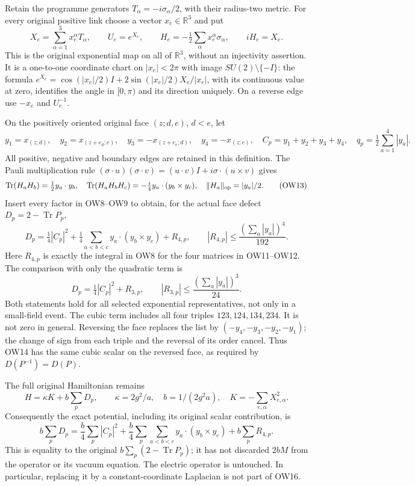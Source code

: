 \documentclass[11pt]{article}
\begin{document}
Retain the programme generators \(T_\alpha=-i\sigma_\alpha/2\), with their radius-two metric. For every original positive link choose a vector \(x_e\in\mathbb R^3\) and put
\[
 X_e=\sum_{\alpha=1}^3x_e^\alpha T_\alpha,
 \qquad U_e=e^{X_e},\qquad H_e=-\tfrac12\sum_\alpha x_e^\alpha\sigma_\alpha,
 \qquad iH_e=X_e.                                        \tag{OW11}
\]
This is the original exponential map on all of \(\mathbb R^3\), without an injectivity assertion. It is a one-to-one coordinate chart on \(|x_e|<2\pi\) with image \(SU(2)\setminus\{-I\}\): the formula \(e^{X_e}=\cos(|x_e|/2)I+2\sin(|x_e|/2)X_e/|x_e|\), with its continuous value at zero, identifies the angle in \([0,\pi)\) and its direction uniquely. On a reverse edge use \(-x_e\) and \(U_e^{-1}\).

On the positively oriented original face \((z;d,e)\), \(d<e\), let
\[
 y_1=x_{(z;d)},\quad y_2=x_{(z+e_d;e)},\quad
 y_3=-x_{(z+e_e;d)},\quad y_4=-x_{(z;e)},\quad
 C_p=y_1+y_2+y_3+y_4,\quad q_p=\tfrac12\sum_{a=1}^4|y_a|.
                                                               \tag{OW12}
\]
All positive, negative and boundary edges are retained in this definition. The Pauli multiplication rule \((\sigma\cdot u)(\sigma\cdot v)=(u\cdot v)I+i\sigma\cdot(u\times v)\) gives
\[
 \operatorname{Tr}(H_aH_b)=\tfrac12y_a\cdot y_b,\quad
 \operatorname{Tr}(H_aH_bH_c)=-\tfrac{i}{4}y_a\cdot(y_b\times y_c),
 \quad \|H_a\|_{\rm op}=|y_a|/2.                         \tag{OW13}
\]
Insert every factor in OW8–OW9 to obtain, for the actual face defect \(D_p=2-\operatorname{Tr}P_p\),
\[
 \boxed{D_p=\tfrac14|C_p|^2+
 \tfrac14\sum_{a<b<c}y_a\cdot(y_b\times y_c)+R_{4,p},
 \qquad |R_{4,p}|\le\frac{(\sum_a|y_a|)^4}{192}.}        \tag{OW14}
\]
Here \(R_{4,p}\) is exactly the integral in OW8 for the four matrices in OW11–OW12. The comparison with only the quadratic term is
\[
 D_p=\tfrac14|C_p|^2+R_{3,p},\qquad
 |R_{3,p}|\le\frac{(\sum_a|y_a|)^3}{24}.                 \tag{OW15}
\]
Both statements hold for all selected exponential representatives, not only in a small-field event. The cubic term includes all four triples \(123,124,134,234\). It is not zero in general. Reversing the face replaces the list by \((-y_4,-y_3,-y_2,-y_1)\); the change of sign from each triple and the reversal of its order cancel. Thus OW14 has the same cubic scalar on the reversed face, as required by \(D(P^{-1})=D(P)\).

The full original Hamiltonian remains
\[
 H=\kappa K+b\sum_pD_p,\qquad
 \kappa=2g^2/a,\quad b=1/(2g^2a),\quad
 K=-\sum_{e,\alpha}X_{e,\alpha}^2.
\]
Consequently the exact potential, including its original scalar contribution, is
\[
 \boxed{b\sum_pD_p=\frac b4\sum_p|C_p|^2+
 \frac b4\sum_p\sum_{a<b<c}y_a\cdot(y_b\times y_c)+b\sum_pR_{4,p}.}
                                                               \tag{OW16}
\]
This is equality to the original \(b\sum_p(2-\operatorname{Tr}P_p)\); it has not discarded \(2bM\) from the operator or its vacuum equation. The electric operator is untouched. In particular, replacing it by a constant-coordinate Laplacian is not part of OW16.
\end{document}
